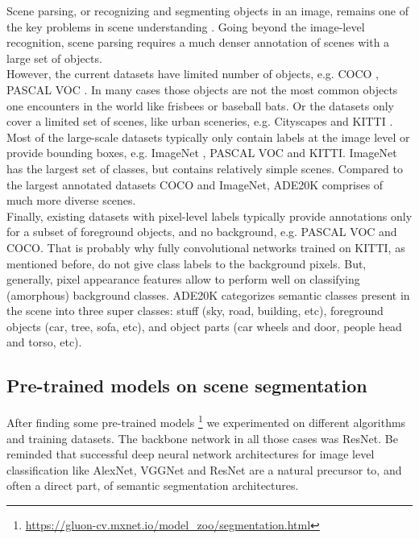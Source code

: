 \documentclass[12pt,a4paper,table,dvipsnames,tikz]{report}
\newcommand{\acronym}{\MakeUppercase}
\begin{document}
	Scene parsing, or recognizing and segmenting objects in an image, remains one 
	of the key problems in scene understanding \citep{Zhou_sem}. Going beyond the image-level 
	recognition, scene parsing requires a much denser annotation of scenes with a large set 
	of objects. 
	\\
	
	However, the current datasets have limited number of objects, e.g. \acronym{coco} 
	\citep{coco}, \acronym{pascal voc} \citep{pascal}. In many cases those objects are not 
	the most common objects one encounters in the world like frisbees or baseball bats. 
	Or the datasets only cover a limited set of scenes, like urban sceneries, e.g. Cityscapes 
	\citep{cityscapes} and \acronym{kitti} \citep{kitti}. Most of the large-scale datasets 
	typically only contain labels at the image level or provide bounding boxes, e.g. ImageNet 
	\citep{Deng}, \acronym{pascal voc} and \acronym{kitti}. ImageNet has the largest set of 
	classes, but contains relatively simple scenes. Compared to the largest annotated datasets 
	\acronym{coco} and ImageNet, \acronym{ade20k} \citep{Zhou_pars} comprises of much more 
	diverse scenes. 
	\\
	
	Finally, existing datasets with pixel-level labels typically provide annotations only 
	for a subset of foreground objects, and no background, e.g. \acronym{pascal voc} and 
	\acronym{coco}. That is probably why fully convolutional networks trained on \acronym{kitti}, 
	as mentioned before, do not give class labels to the background pixels. But, generally, 
	pixel appearance features allow to perform well on classifying (amorphous) background 
	classes. \acronym{ade20k} categorizes semantic classes present in the scene into three 
	super classes: stuff (sky, 
	road, building, etc), foreground objects (car, tree, sofa, etc), and object parts (car 
	wheels and door, people head and torso, etc).
	\\
	
	
	\subsection{Pre-trained models on scene segmentation}
	\label{sec:fg:nn:pre}
	
	After finding some pre-trained models \footnote{ \url{https://gluon-cv.mxnet.io/model_zoo/segmentation.html}}
	we experimented on different algorithms and training datasets. The backbone network in 
	all those cases was ResNet. Be reminded that successful deep neural network architectures 
	for image level classification like AlexNet, VGGNet and ResNet are a natural precursor 
	to, and often a direct part, of semantic segmentation architectures. 
	\\
	
\end{document}
